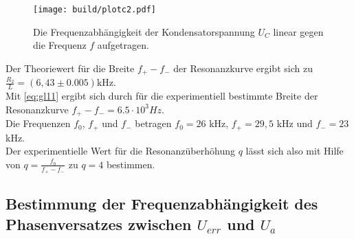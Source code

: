 \begin{figure}
  \centering
  \texttt{[image: build/plotc2.pdf]}
  \caption{Die Frequenzabhängigkeit der Kondensatorspannung $U_C$ linear gegen die Frequenz $f$ aufgetragen.}
  \label{fig:plotc2}
\end{figure}

Der Theoriewert für die Breite $f_+-f_-$ der Resonanzkurve ergibt sich zu $\frac{R_2}{L} = (6,43 \pm 0.005)\mathrm{kHz}$.\\ 
Mit \autoref{eq:gl11} ergibt sich durch für die experimentiell bestimmte Breite der Resonanzkurve $f_+ - f_- = 6.5 \cdot 10^3 Hz$. \\
Die Frequenzen $f_0$, $f_+$ und $f_-$ betragen $f_0 = 26$ kHz, $f_+ = 29,5$ kHz und $f_- = 23$ kHz. \\
Der experimentielle Wert für die Resonanzüberhöhung $q$ lässt sich also mit Hilfe von $q = \frac{f_0}{f_+ - f_-}$ zu $q = 4$ bestimmen. \\




\subsection{Bestimmung der Frequenzabhängigkeit des Phasenversatzes zwischen $U_{err}$ und $U_{a}$}
\label{Phasenversatz}


